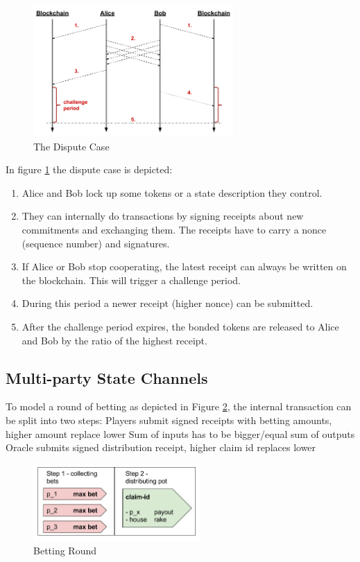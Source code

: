 \begin{figure}[!t]
\centering
\includegraphics[width=3.0in]{images/dispute.png}
\caption{The Dispute Case}
\label{pc_dispute}
\end{figure}

In figure \ref{pc_dispute} the dispute case is depicted:

\begin{enumerate}
\item Alice and Bob lock up some tokens or a state description they control.
\item They can internally do transactions by signing receipts about new commitments and exchanging them. The receipts have to carry a nonce (sequence number) and signatures.
\item If Alice or Bob stop cooperating, the latest receipt can always be written on the blockchain. This will trigger a challenge period.
\item During this period a newer receipt (higher nonce) can be submitted.
\item After the challenge period expires, the bonded tokens are released to Alice and Bob by the ratio of the highest receipt.
\end{enumerate}

\subsection{Multi-party State Channels}


To model a round of betting as depicted in Figure \ref{mpc_round}, the internal transaction can be split into two steps:
Players submit signed receipts with betting amounts, higher amount replace lower
Sum of inputs has to be bigger/equal sum of outputs
Oracle submits signed distribution receipt, higher claim id replaces lower

\begin{figure}[!t]
\centering
\includegraphics[width=2.5in]{images/bet.png}
\caption{Betting Round}
\label{mpc_round}
\end{figure}


